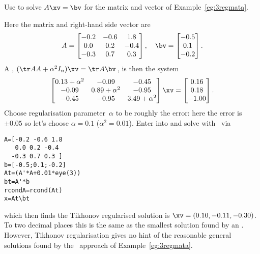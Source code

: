 \begin{example} \label{eg:}
Use  to solve \(A\xv=\bv\) for the matrix and vector of Example~\ref{eg:3regmata}.
\begin{solution} 
Here the matrix and right-hand side vector are
\begin{equation*}
A=\begin{bmatrix} -0.2&-0.6&1.8
\\ 0.0&0.2&-0.4
\\ -0.3&0.7&0.3 \end{bmatrix}, \quad
\bv=\begin{bmatrix} -0.5
\\ 0.1
\\ -0.2
 \end{bmatrix}.
\end{equation*}
A , \((\tr AA+\alpha^2I_n)\xv=\tr A\bv\)\,, is then the system
\begin{equation*}
\begin{bmatrix} 0.13+\alpha^2&-0.09&-0.45
\\-0.09&0.89+\alpha^2 &-0.95
\\-0.45&-0.95&3.49+\alpha^2\end{bmatrix}\xv
=\begin{bmatrix} 0.16\\0.18\\-1.00 \end{bmatrix}.
\end{equation*}
Choose regularisation parameter~\(\alpha\) to be roughly the error: here the error is~\(\pm0.05\) so let's choose \(\alpha=0.1\) (\(\alpha^2=0.01\)).
Enter into and solve with \script\ via
\begin{verbatim}
A=[-0.2 -0.6 1.8
   0.0 0.2 -0.4
  -0.3 0.7 0.3 ]
b=[-0.5;0.1;-0.2]
At=(A'*A+0.01*eye(3))
bt=A'*b
rcondA=rcond(At)
x=At\bt
\end{verbatim}
\setbox\ajrqrbox\hbox{}%
\marginpar{\usebox{\ajrqrbox\\[2ex]}}%
which then finds the Tikhonov regularised solution is \(\xv=(0.10,-0.11,-0.30)\).
To two decimal places this is the same as the smallest solution found by an \svd.
However, Tikhonov regularisation gives no hint of the reasonable general solutions found by the \svd\ approach of Example~\ref{eg:3regmata}.
\end{solution}
\end{example}








